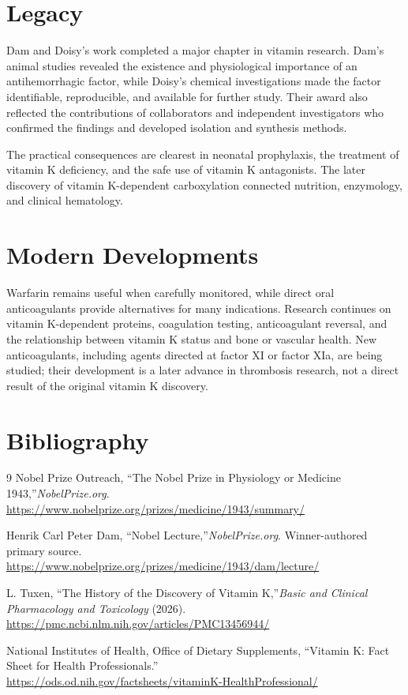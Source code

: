 \section{Legacy}

Dam and Doisy's work completed a major chapter in vitamin research. Dam's animal studies revealed the existence and physiological importance of an antihemorrhagic factor, while Doisy's chemical investigations made the factor identifiable, reproducible, and available for further study. Their award also reflected the contributions of collaborators and independent investigators who confirmed the findings and developed isolation and synthesis methods.

The practical consequences are clearest in neonatal prophylaxis, the treatment of vitamin K deficiency, and the safe use of vitamin K antagonists. The later discovery of vitamin K-dependent carboxylation connected nutrition, enzymology, and clinical hematology.

\section{Modern Developments}

Warfarin remains useful when carefully monitored, while direct oral anticoagulants provide alternatives for many indications. Research continues on vitamin K-dependent proteins, coagulation testing, anticoagulant reversal, and the relationship between vitamin K status and bone or vascular health. New anticoagulants, including agents directed at factor XI or factor XIa, are being studied; their development is a later advance in thrombosis research, not a direct result of the original vitamin K discovery.

\section{Bibliography}

\begin{thebibliography}{9}
Nobel Prize Outreach, ``The Nobel Prize in Physiology or Medicine 1943,''\emph{NobelPrize.org}.\\
\url{https://www.nobelprize.org/prizes/medicine/1943/summary/}

Henrik Carl Peter Dam, ``Nobel Lecture,''\emph{NobelPrize.org}. Winner-authored primary source.\\
\url{https://www.nobelprize.org/prizes/medicine/1943/dam/lecture/}

L. Tuxen, ``The History of the Discovery of Vitamin K,''\emph{Basic and Clinical Pharmacology and Toxicology} (2026).\\
\url{https://pmc.ncbi.nlm.nih.gov/articles/PMC13456944/}

National Institutes of Health, Office of Dietary Supplements, ``Vitamin K: Fact Sheet for Health Professionals.''\\
\url{https://ods.od.nih.gov/factsheets/vitaminK-HealthProfessional/}
\end{thebibliography}
